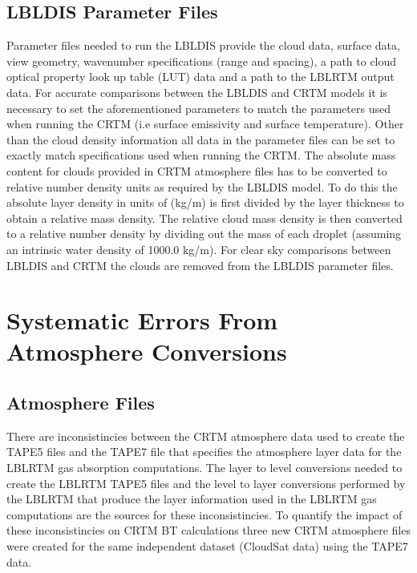 \subsection{LBLDIS Parameter Files}
Parameter files needed to run the LBLDIS provide the cloud data, surface data, view geometry, wavenumber specifications (range and spacing), a path to cloud optical property look up table (LUT) data and a path to the LBLRTM output data. For accurate comparisons between the LBLDIS and CRTM models it is necessary to set the aforementioned
parameters to match the parameters used when running the CRTM (i.e surface emissivity and surface temperature).  
Other than the cloud density information all data in the parameter files can be set to exactly match specifications used when running the CRTM. The absolute mass content for clouds provided in CRTM atmosphere files has to be converted to relative number density units as required by the LBLDIS model.
To do this the absolute layer density in units of (kg/m) is first divided by the layer thickness to obtain a relative mass density. The relative cloud mass density is then converted to a relative number density by dividing out the mass of each droplet (assuming an intrinsic water density of 1000.0 kg/m).  
For clear sky comparisons between LBLDIS and CRTM the clouds are removed from the LBLDIS parameter files. 


\section{Systematic Errors From Atmosphere Conversions}

\subsection{Atmosphere Files}
There are inconsistincies between the CRTM atmosphere data used to create the TAPE5 files and the TAPE7 file that specifies the atmosphere layer data for the LBLRTM gas
absorption computations. The layer to level conversions needed to create the LBLRTM TAPE5 files and the level to layer conversions performed by the LBLRTM that produce the layer information used in the LBLRTM gas computations are the sources for these inconsistincies. To quantify the impact of these inconsistincies on CRTM BT calculations three new CRTM atmosphere files were created for the same independent dataset (CloudSat data) using the TAPE7 data. 

